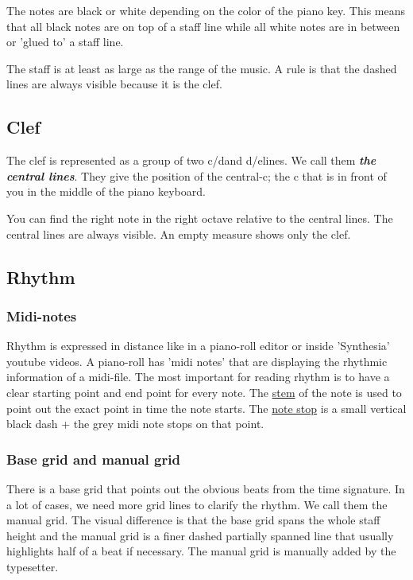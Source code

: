 \documentclass[11pt,a4paper]{article}
\begin{document}
The notes are black or white depending on the color of the piano key. This means that all black notes are on top of a staff line while all white notes are in between or 'glued to' a staff line.

The staff is at least as large as the range of the music. A rule is that the dashed lines are always visible because it is the clef.

\subsection{Clef}
The clef is represented as a group of two c\musSharp/d\musFlat \space and d\musSharp/e\musFlat\space lines. We call them \emph{\textbf{the central lines}}. They give the position of the central-c; the c that is in front of you in the middle of the piano keyboard.

You can find the right note in the right octave relative to the central lines. The central lines are always visible. An empty measure shows only the clef.

\subsection{Rhythm}
\subsubsection{Midi-notes}
Rhythm is expressed in distance like in a piano-roll editor or inside 'Synthesia' youtube videos. A piano-roll has 'midi notes' that are displaying the rhythmic information of a midi-file. The most important for reading rhythm is to have a clear starting point and end point for every note. The \underline{stem} of the note is used to point out the exact point in time the note starts. The \underline{note stop} is a small vertical black dash + the grey midi note stops on that point.

\subsubsection{Base grid and manual grid}
There is a base grid that points out the obvious beats from the time signature. In a lot of cases, we need more grid lines to clarify the rhythm. We call them the manual grid. The visual difference is that the base grid spans the whole staff height and the manual grid is a finer dashed partially spanned line that usually highlights half of a beat if necessary. The manual grid is manually added by the typesetter.
\end{document}
